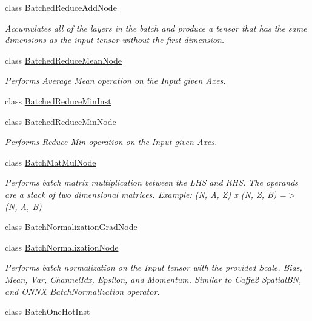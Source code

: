 \begin{DoxyCompactItemize}
\item 
class \hyperlink{classglow_1_1_batched_reduce_add_node}{Batched\+Reduce\+Add\+Node}
\begin{DoxyCompactList}\small\item\em Accumulates all of the layers in the batch and produce a tensor that has the same dimensions as the input tensor without the first dimension. \end{DoxyCompactList}\item 
class \hyperlink{classglow_1_1_batched_reduce_mean_node}{Batched\+Reduce\+Mean\+Node}
\begin{DoxyCompactList}\small\item\em Performs Average Mean operation on the Input given Axes. \end{DoxyCompactList}\item 
class \hyperlink{classglow_1_1_batched_reduce_min_inst}{Batched\+Reduce\+Min\+Inst}
\item 
class \hyperlink{classglow_1_1_batched_reduce_min_node}{Batched\+Reduce\+Min\+Node}
\begin{DoxyCompactList}\small\item\em Performs Reduce Min operation on the Input given Axes. \end{DoxyCompactList}\item 
class \hyperlink{classglow_1_1_batch_mat_mul_node}{Batch\+Mat\+Mul\+Node}
\begin{DoxyCompactList}\small\item\em Performs batch matrix multiplication between the L\+HS and R\+HS. The operands are a stack of two dimensional matrices. Example\+: (N, A, Z) x (N, Z, B) =$>$ (N, A, B) \end{DoxyCompactList}\item 
class \hyperlink{classglow_1_1_batch_normalization_grad_node}{Batch\+Normalization\+Grad\+Node}
\item 
class \hyperlink{classglow_1_1_batch_normalization_node}{Batch\+Normalization\+Node}
\begin{DoxyCompactList}\small\item\em Performs batch normalization on the Input tensor with the provided Scale, Bias, Mean, Var, Channel\+Idx, Epsilon, and Momentum. Similar to Caffe2 Spatial\+BN, and O\+N\+NX Batch\+Normalization operator. \end{DoxyCompactList}\item 
class \hyperlink{classglow_1_1_batch_one_hot_inst}{Batch\+One\+Hot\+Inst}
\item 

\end{DoxyCompactItemize}
